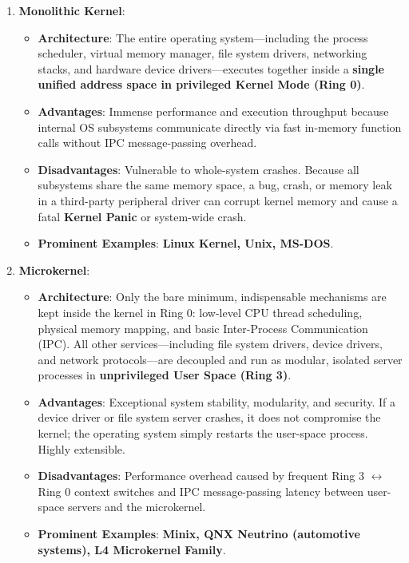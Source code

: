 \begin{enumerate}[leftmargin=1.5em]
    \item \textbf{Monolithic Kernel}:
    \begin{itemize}
        \item \textbf{Architecture}: The entire operating system—including the process scheduler, virtual memory manager, file system drivers, networking stacks, and hardware device drivers—executes together inside a \textbf{single unified address space in privileged Kernel Mode (Ring 0)}.
        \item \textbf{Advantages}: Immense performance and execution throughput because internal OS subsystems communicate directly via fast in-memory function calls without IPC message-passing overhead.
        \item \textbf{Disadvantages}: Vulnerable to whole-system crashes. Because all subsystems share the same memory space, a bug, crash, or memory leak in a third-party peripheral driver can corrupt kernel memory and cause a fatal \textbf{Kernel Panic} or system-wide crash.
        \item \textbf{Prominent Examples}: \textbf{Linux Kernel, Unix, MS-DOS}.
    \end{itemize}

    \item \textbf{Microkernel}:
    \begin{itemize}
        \item \textbf{Architecture}: Only the bare minimum, indispensable mechanisms are kept inside the kernel in Ring 0: low-level CPU thread scheduling, physical memory mapping, and basic Inter-Process Communication (IPC). All other services—including file system drivers, device drivers, and network protocols—are decoupled and run as modular, isolated server processes in \textbf{unprivileged User Space (Ring 3)}.
        \item \textbf{Advantages}: Exceptional system stability, modularity, and security. If a device driver or file system server crashes, it does not compromise the kernel; the operating system simply restarts the user-space process. Highly extensible.
        \item \textbf{Disadvantages}: Performance overhead caused by frequent Ring 3 $\leftrightarrow$ Ring 0 context switches and IPC message-passing latency between user-space servers and the microkernel.
        \item \textbf{Prominent Examples}: \textbf{Minix, QNX Neutrino (automotive systems), L4 Microkernel Family}.
    \end{itemize}


\end{enumerate}
